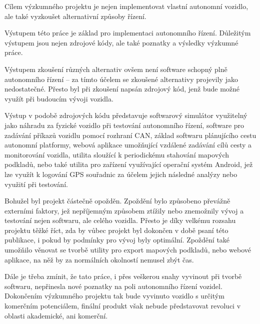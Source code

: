 \documentclass[czech, bachelor]{diploma}
\begin{document}
Cílem výzkumného projektu je nejen implementovat vlastní autonomní vozidlo, ale také vyzkoušet alternativní způsoby řízení. 

Výstupem této práce je základ pro implementaci autonomního řízení. Důležitým výstupem jsou nejen zdrojové kódy, ale také poznatky
a výsledky výzkumné práce. 

Výstupem zkoušení různých alternativ ovšem není software schopný plně autonomního řízení -- za tímto účelem se zkoušené
alternativy projevily jako nedostatečné. Přesto byl při zkoušení napsán zdrojový kód, jenž bude možné využít při budoucím vývoji
vozidla. 

Výstup v podobě zdrojových kódu představuje softwarový simulátor využitelný jako náhradu za fyzické vozidlo při testování 
autonomního řízení, software pro zadávání příkazů vozidlu pomocí rozhraní CAN, základ softwaru plánujícího cestu autonomní 
platformy, webová aplikace umožňující vzdálené zadávání cílů cesty a monitorování vozidla, utilita sloužící k periodickému
stahování mapových podkladů, nebo také utilita pro zařízení využívající operační systém Android, jež lze využít k logování GPS 
souřadnic za účelem jejich následné analýzy nebo využití při testování.

Bohužel byl projekt částečně opožděn. Zpoždění bylo způsobeno převážně externími faktory, jež nepříjemným způsobem ztížily nebo
znemožnily vývoj a testování nejen softwaru, ale celého vozidla. Přesto je díky velkému rozsahu projektu těžké říct, zda by vůbec
projekt byl dokončen v době psaní této publikace, i pokud by podmínky pro vývoj byly optimální. Zpoždění také umožňilo věnovat se 
tvorbě utility pro export mapových podkladů, nebo webové aplikace, na něž by za normálních okolností nemusel zbýt čas.

Dále je třeba zmínit, že tato práce, i přes veškerou snahy vyvinout při tvorbě softwaru, nepřinesla nové poznatky na poli 
autonomního řízení vozidel. Dokončením výzkumného projektu tak bude vyvinuto vozidlo s určitým komerčním potenciálem, finální 
produkt však nebude představovat revoluci v oblasti akademické, ani komerční.
\end{document}
